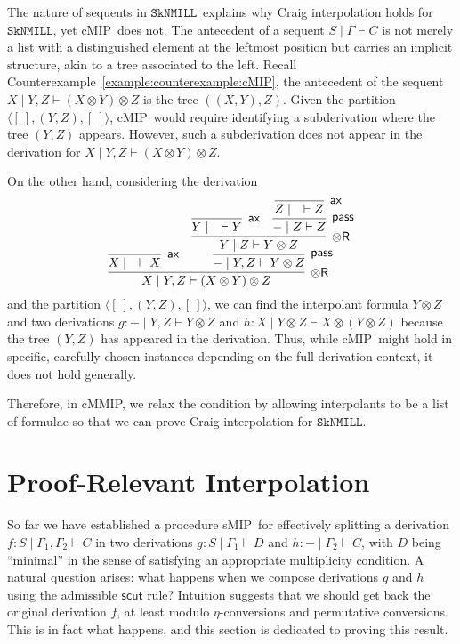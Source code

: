 \documentclass[sn-mathphys-num]{sn-jnl}%
\newcommand{\GG}{\Gamma}
\newcommand{\vd}{\vdash}
\newcommand{\tr}{\otimes\mathsf{R}}
\newcommand{\pass}{\mathsf{pass}}
\newcommand{\ax}{\mathsf{ax}}
\newcommand{\ot}{\otimes}
\newcommand{\SkNMILL}{$\mathtt{SkNMILL}$}
\newcommand{\sMIP}{\textsf{sMIP}}
\newcommand{\cMIP}{\textsf{cMIP}}
\newcommand{\cMMIP}{\textsf{cMMIP}}
\theoremstyle{thmstyleone}%
\theoremstyle{thmstyletwo}%
\theoremstyle{thmstylethree}%
\begin{document}
The nature of sequents in \SkNMILL\ explains why Craig interpolation holds for \SkNMILL, yet \cMIP\ does not. The antecedent of a sequent $S \mid \GG \vd C$ is not merely a list with a distinguished element at the leftmost position but carries an implicit structure, akin to a tree associated to the left.
Recall Counterexample~\ref{example:counterexample:cMIP}, the antecedent of the sequent $X \mid Y , Z \vd (X \ot Y) \ot Z$ is the tree $((X , Y) , Z)$.
Given the partition $\langle [\ ], (Y,Z),[\ ]\rangle$, \cMIP\ would require identifying a subderivation where the tree $(Y,Z)$ appears. However, such a subderivation does not appear in the derivation for $X \mid Y , Z \vd (X \ot Y) \ot Z$.

On the other hand, considering the derivation
\begin{equation*}
  \infer[\tr]{X \mid Y, Z \vd (X\ot Y)\ot Z}{
  \infer[\ax]{X \mid \quad \vd X}{}
  &
  \infer[\pass]{{-} \mid Y , Z \vd Y \ot Z}{
  \infer[\tr]{Y \mid Z \vd Y \ot Z}{
  \infer[\ax]{Y \mid \quad \vd Y}{}
  &
  \infer[\pass]{{-} \mid Z \vd Z}{
  \infer[\ax]{Z \mid \quad \vd Z}{}
  }
  }
  }
  }
\end{equation*}
and the partition $\langle [\ ], (Y,Z), [\ ]\rangle$, we can find the interpolant formula $Y \ot Z$ and two derivations $g: {-} \mid Y, Z \vd Y \ot Z$ and $h : X \mid Y \ot Z \vd X\ot (Y \ot Z)$ because the tree $(Y , Z)$ has appeared in the derivation.
Thus, while \cMIP\ might hold in specific, carefully chosen instances depending on the full derivation context, it does not hold generally.

Therefore, in \cMMIP, we relax the condition by allowing interpolants to be a list of formulae so that we can prove Craig interpolation for \SkNMILL.

\section{Proof-Relevant Interpolation}\label{sec:proof-rel} 

So far we have established a procedure \sMIP~for effectively splitting a derivation $f : S \mid \GG_1 , \GG_2 \vd C$ in two derivations $g : S \mid \GG_1 \vd D$ and $h : {-} \mid \GG_2 \vd C$, with $D$ being ``minimal'' in the sense of satisfying an appropriate multiplicity condition.
A natural question arises: what happens when we compose derivations $g$ and $h$ using the admissible $\mathsf{scut}$ rule?
Intuition suggests that we should get back the original derivation $f$, at least modulo $\eta$-conversions and permutative conversions.
This is in fact what happens, and this section is dedicated to proving this result.
\end{document}
